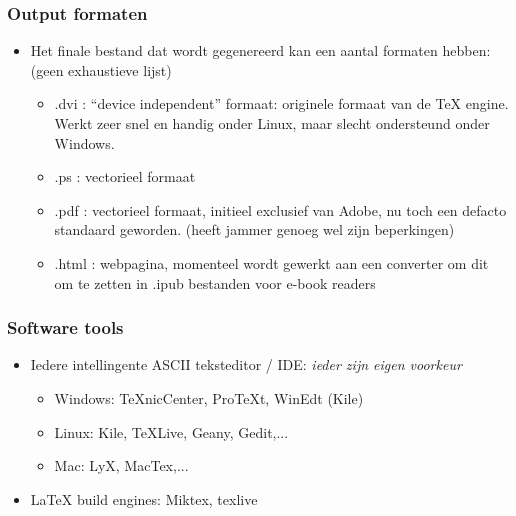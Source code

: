 \documentclass{beamer}
\begin{document}

\begin{frame}
\frametitle{Output formaten}
\begin{itemize}
 \item Het finale bestand dat wordt gegenereerd kan een aantal formaten hebben: (geen exhaustieve lijst)
\begin{itemize}
 \item .dvi : ``device independent'' formaat: originele formaat van de TeX engine. Werkt zeer snel en handig onder Linux, maar slecht ondersteund onder Windows.
 \item .ps :  vectorieel formaat
 \item .pdf : vectorieel formaat, initieel exclusief van Adobe, nu toch een defacto standaard geworden. (heeft jammer genoeg wel zijn beperkingen)
 \item .html : webpagina, momenteel wordt gewerkt aan een converter om dit om te zetten in .ipub bestanden voor e-book readers
\end{itemize}
 \end{itemize}
\end{frame}


\begin{frame}
\frametitle{Software tools}
\begin{itemize}
 \item Iedere intellingente ASCII teksteditor / IDE: \textit{ieder zijn eigen voorkeur}
    \begin{itemize}
    \item Windows: TeXnicCenter, ProTeXt, WinEdt (Kile)
    \item Linux: Kile, TeXLive, Geany, Gedit,...
    \item Mac: LyX, MacTex,...
    \end{itemize}
 \item \LaTeX $ $ build engines: Miktex, texlive
\end{itemize}
\end{frame}

\end{document}
